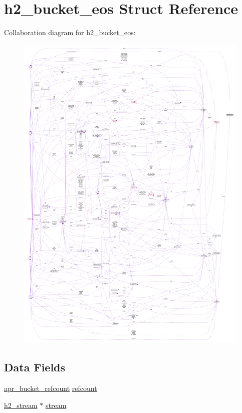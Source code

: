 \hypertarget{structh2__bucket__eos}{}\section{h2\+\_\+bucket\+\_\+eos Struct Reference}
\label{structh2__bucket__eos}


Collaboration diagram for h2\+\_\+bucket\+\_\+eos\+:
\nopagebreak
\begin{figure}[H]
\begin{center}
\leavevmode
\includegraphics[width=350pt]{structh2__bucket__eos__coll__graph}
\end{center}
\end{figure}
\subsection*{Data Fields}
\begin{DoxyCompactItemize}
\item 
\hyperlink{structapr__bucket__refcount}{apr\+\_\+bucket\+\_\+refcount} \hyperlink{structh2__bucket__eos_adec1e50fc255bbc2550f4da9a600a2d9}{refcount}
\item 
\hyperlink{structh2__stream}{h2\+\_\+stream} $\ast$ \hyperlink{structh2__bucket__eos_a314f10f3da5ca4e49518c60e6dad5fda}{stream}
\end{DoxyCompactItemize}


